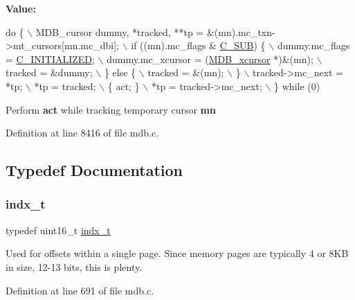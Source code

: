 {\bfseries Value\+:}
\begin{DoxyCode}
\textcolor{keywordflow}{do} \{ \(\backslash\)
    MDB\_cursor dummy, *tracked, **tp = &(mn).mc\_txn->mt\_cursors[mn.mc\_dbi]; \(\backslash\)
    if ((mn).mc\_flags & \mbox{\hyperlink{group__mdb__cursor_ga31bd2871aca0e24b95e6d50b916f7b5b}{C\_SUB}}) \{ \(\backslash\)
        dummy.mc\_flags =  \mbox{\hyperlink{group__mdb__cursor_ga491771b32c4fdf08d7b66ffb20bbbb32}{C\_INITIALIZED}}; \(\backslash\)
        dummy.mc\_xcursor = (\mbox{\hyperlink{struct_m_d_b__xcursor}{MDB\_xcursor}} *)&(mn); \(\backslash\)
        tracked = &dummy; \(\backslash\)
    \} \textcolor{keywordflow}{else} \{ \(\backslash\)
        tracked = &(mn); \(\backslash\)
    \} \(\backslash\)
    tracked->mc\_next = *tp; \(\backslash\)
    *tp = tracked; \(\backslash\)
    \{ act; \} \(\backslash\)
    *tp = tracked->mc\_next; \(\backslash\)
\} \textcolor{keywordflow}{while} (0)
\end{DoxyCode}
Perform {\bfseries act} while tracking temporary cursor {\bfseries mn} 

Definition at line 8416 of file mdb.\+c.



\subsection{Typedef Documentation}
\mbox{\label{group__internal_ga730e17f748208d77496ebd895c8375dc}} 
\subsubsection{\texorpdfstring{indx\+\_\+t}{indx\_t}}
{\footnotesize\ttfamily typedef uint16\+\_\+t \mbox{\hyperlink{group__internal_ga730e17f748208d77496ebd895c8375dc}{indx\+\_\+t}}}

Used for offsets within a single page. Since memory pages are typically 4 or 8\+KB in size, 12-\/13 bits, this is plenty. 

Definition at line 691 of file mdb.\+c.

\mbox{\label{group__internal_ga5e8c249078ee035ffbd91eb61628e5bb}} 
